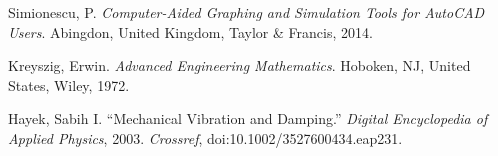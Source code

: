 \begin{thebibliography}{12}








Simionescu, P. \emph{Computer-Aided Graphing and Simulation Tools for AutoCAD Users}. Abingdon, United Kingdom, Taylor & Francis, 2014.

Kreyszig, Erwin. \emph{Advanced Engineering Mathematics}. Hoboken, NJ, United States, Wiley, 1972.

Hayek, Sabih I. “Mechanical Vibration and Damping.” \emph{Digital Encyclopedia of Applied Physics}, 2003. \emph{Crossref}, doi:10.1002/3527600434.eap231.


\end{thebibliography}
